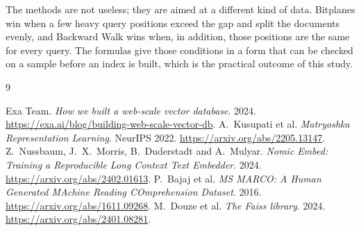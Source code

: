 The methods are not useless; they are aimed at a different kind of data. Bitplanes win
when a few heavy query positions exceed the gap and split the documents evenly, and Backward
Walk wins when, in addition, those positions are the same for every query. The formulas
give those conditions in a form that can be checked on a sample before an index is built,
which is the practical outcome of this study.

\begin{thebibliography}{9}\small\raggedright
{} Exa Team. \emph{How we built a web-scale vector database}. 2024.
\url{https://exa.ai/blog/building-web-scale-vector-db}.
 A.~Kusupati et al. \emph{Matryoshka Representation Learning}. NeurIPS 2022.
\url{https://arxiv.org/abs/2205.13147}.
 Z.~Nussbaum, J.~X.~Morris, B.~Duderstadt and A.~Mulyar. \emph{Nomic Embed:
Training a Reproducible Long Context Text Embedder}. 2024.
\url{https://arxiv.org/abs/2402.01613}.
 P.~Bajaj et al. \emph{MS MARCO: A Human Generated MAchine Reading
COmprehension Dataset}. 2016. \url{https://arxiv.org/abs/1611.09268}.
 M.~Douze et al. \emph{The Faiss library}. 2024.
\url{https://arxiv.org/abs/2401.08281}.
\end{thebibliography}
